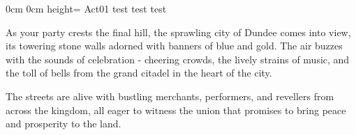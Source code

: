 	{}%
	{0cm}%
	{0cm}%
	{height=\paperheight}%
	{Act01}%
	{test}%
	{test}%
	{test}%


\begin{DndReadAloud}
	As your party crests the final hill, the sprawling city of Dundee comes into view, its towering stone walls adorned with banners of blue and gold. The air buzzes with the sounds of celebration - cheering crowds, the lively strains of music, and the toll of bells from the grand citadel in the heart of the city.
	
	The streets are alive with bustling merchants, performers, and revellers from across the kingdom, all eager to witness the union that promises to bring peace and prosperity to the land.
\end{DndReadAloud}

